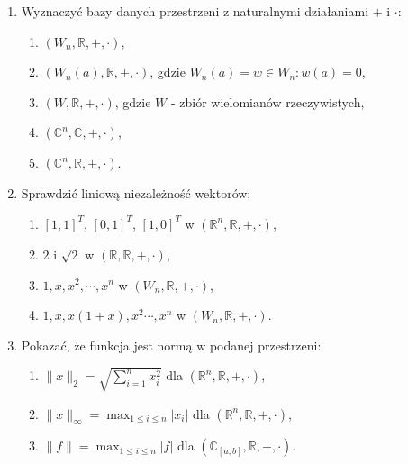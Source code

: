 \documentclass{article}
\begin{document}
\begin{enumerate}
    \item Wyznaczyć bazy danych przestrzeni z naturalnymi działaniami $+$ i $\cdot$:
        \begin{enumerate}
            \item $(W_{n}, \mathbb{R}, +, \cdot)$,
            \item $(W_{n}(a), \mathbb{R}, +, \cdot)$, gdzie $W_{n}(a) = {w \in W_{n}: w(a) = 0}$,
            \item $(W, \mathbb{R}, +, \cdot)$, gdzie $W$ - zbiór wielomianów rzeczywistych,
            \item $(\mathbb{C}^{n}, \mathbb{C}, +, \cdot)$,
            \item $(\mathbb{C}^{n}, \mathbb{R}, +, \cdot)$.
        \end{enumerate}

    \item Sprawdzić liniową niezależność wektorów:
        \begin{enumerate}
            \item $[1, 1]^T$, $[0, 1]^T$, $[1, 0]^T$ w $(\mathbb{R}^{n}, \mathbb{R}, +, \cdot)$,
            \item $2$ i $\sqrt{2}$ w $(\mathbb{R}, \mathbb{R}, +, \cdot)$,
            \item $1, x, x^{2}, \cdots, x^{n}$ w $(W_{n}, \mathbb{R}, +, \cdot)$,
            \item $1, x, x(1 + x), x^{2} \cdots, x^{n}$ w $(W_{n}, \mathbb{R}, +, \cdot)$.
        \end{enumerate}

    \item Pokazać, że funkcja jest normą w podanej przestrzeni:
        \begin{enumerate}
            \item $\| x \|_{2} = \sqrt{\sum_{i=1}^{n}{x_{i}^{2}}}$ dla $(\mathbb{R}^{n}, \mathbb{R}, +, \cdot)$,
            \item $\| x \|_{\infty} = \max_{1 \leq i \leq n} |x_{i}|$ dla $(\mathbb{R}^{n}, \mathbb{R}, +, \cdot)$,
            \item $\| f \| = \max_{1 \leq i \leq n} |f|$ dla $(\mathbb{C}_{[a,b]}, \mathbb{R}, +, \cdot)$.
        \end{enumerate}
    
\end{enumerate}
\end{document}
